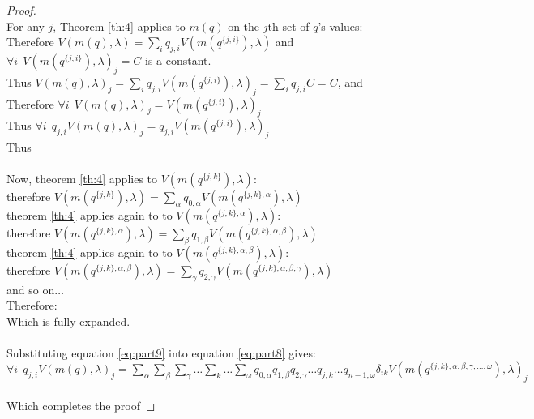 \begin{proof}$~$\\
For any $j$, Theorem \ref{th:4} applies to $m(q)$ on the $j$th set of $q$'s values:\\
Therefore $V(m(q),\lambda)=\sum_i q_{j,i}V(m(q^{\{j,i\}}),\lambda)$ and $\forall i~~V(m(q^{\{j,i\}}),\lambda)_j=C$ is a constant.\\
Thus $V(m(q),\lambda)_j=\sum_i q_{j,i}V(m(q^{\{j,i\}}),\lambda)_j=\sum_i q_{j,i}C=C$, and\\
Therefore $\forall i~~V(m(q),\lambda)_j=V(m(q^{\{j,i\}}),\lambda)_j$\\
Thus $\forall i~~q_{j,i}V(m(q),\lambda)_j= q_{j,i}V(m(q^{\{j,i\}}),\lambda)_j$\\
Thus \\
\\
Now, theorem \ref{th:4} applies to $V(m(q^{\{j,k\}}),\lambda)$:\\
therefore $V(m(q^{\{j,k\}}),\lambda) = \sum_\alpha q_{0,\alpha}V(m(q^{\{j,k\},\alpha}),\lambda)$\\
theorem \ref{th:4} applies again to to $V(m(q^{\{j,k\},\alpha}),\lambda)$:\\
therefore $V(m(q^{\{j,k\},\alpha}),\lambda) = \sum_\beta q_{1,\beta}V(m(q^{\{j,k\},\alpha,\beta}),\lambda)$\\
theorem \ref{th:4} applies again to to $V(m(q^{\{j,k\},\alpha,\beta}),\lambda)$:\\
therefore $V(m(q^{\{j,k\},\alpha,\beta}),\lambda) = \sum_\gamma q_{2,\gamma}V(m(q^{\{j,k\},\alpha,\beta,\gamma}),\lambda)$\\
and so on$\dots$\\
Therefore: \\
Which is fully expanded.\\
\\
Substituting equation \ref{eq:part9} into equation \ref{eq:part8} gives:\\
$\forall i~~q_{j,i}V(m(q),\lambda)_j = \sum_\alpha\sum_\beta\sum_\gamma\dots\sum_k\dots\sum_\omega q_{0,\alpha}q_{1,\beta}q_{2,\gamma}\dots q_{j,k}\dots q_{n-1,\omega}\delta_{ik}V(m(q^{\{j,k\},\alpha,\beta,\gamma,\dots,\omega}),\lambda)_j$\\
\\
Which completes the proof
\end{proof}
